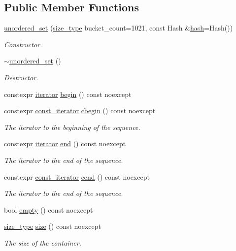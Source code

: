 \subsection*{Public Member Functions}
\begin{DoxyCompactItemize}
\item 
\hyperlink{classshad_1_1unordered__set_a05537f8a3c0c08af1910e2780b113f32}{unordered\-\_\-set} (\hyperlink{group__Types_gaf733341726e3097cf440257afa76d76a}{size\-\_\-type} bucket\-\_\-count=1021, const Hash \&\hyperlink{structshad_1_1hash}{hash}=Hash())
\begin{DoxyCompactList}\small\item\em Constructor. \end{DoxyCompactList}\item 
\hyperlink{classshad_1_1unordered__set_aa85876afdf2158838521bcaf4b270fa7}{$\sim$unordered\-\_\-set} ()
\begin{DoxyCompactList}\small\item\em Destructor. \end{DoxyCompactList}\item 
constexpr \hyperlink{group__Types_gadbad50ac069a38bd820c0a9f532f903e}{iterator} \hyperlink{group__Iterators_gaed1fcf07d265d37157a2bd2614b32693}{begin} () const noexcept
\item 
constexpr \hyperlink{group__Types_ga074f67d0516c3a68d8c79976aef62fb1}{const\-\_\-iterator} \hyperlink{group__Iterators_ga4317481540662a5afe3078e89b8012dd}{cbegin} () const noexcept
\begin{DoxyCompactList}\small\item\em The iterator to the beginning of the sequence. \end{DoxyCompactList}\item 
constexpr \hyperlink{group__Types_gadbad50ac069a38bd820c0a9f532f903e}{iterator} \hyperlink{group__Iterators_ga8ef3a0bbbef71c5658dbb7d6bd9751e9}{end} () const noexcept
\begin{DoxyCompactList}\small\item\em The iterator to the end of the sequence. \end{DoxyCompactList}\item 
constexpr \hyperlink{group__Types_ga074f67d0516c3a68d8c79976aef62fb1}{const\-\_\-iterator} \hyperlink{group__Iterators_ga5be7a60951a7f054b7770b385e370840}{cend} () const noexcept
\begin{DoxyCompactList}\small\item\em The iterator to the end of the sequence. \end{DoxyCompactList}\item 
bool \hyperlink{group__Capacity_gaa881674aa4274da05c2389348d09bbd3}{empty} () const noexcept
\item 
\hyperlink{group__Types_gaf733341726e3097cf440257afa76d76a}{size\-\_\-type} \hyperlink{group__Capacity_ga2586e3957d1c48a278edaaa1be72f92b}{size} () const noexcept
\begin{DoxyCompactList}\small\item\em The size of the container. \end{DoxyCompactList}\end{DoxyCompactItemize}
